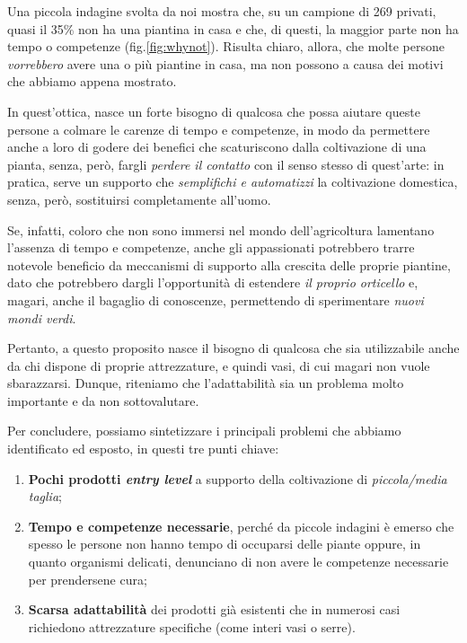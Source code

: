 Una piccola indagine svolta da noi mostra che, su un campione di 269 privati, quasi il 35\% non ha una piantina in casa e che, di questi, la maggior parte non ha tempo o competenze (fig.\ref{fig:whynot}).
Risulta chiaro, allora, che molte persone \textit{vorrebbero} avere una o più piantine in casa, ma non possono a causa dei motivi che abbiamo appena mostrato.

In quest'ottica, nasce un forte bisogno di qualcosa che possa aiutare queste persone a colmare le carenze di tempo e competenze, in modo da permettere anche a loro di godere dei benefici che scaturiscono dalla coltivazione di una pianta, senza, però, fargli \textit{perdere il contatto} con il senso stesso di quest'arte: in pratica, serve un supporto che \textit{semplifichi e automatizzi} la coltivazione domestica, senza, però, sostituirsi completamente all'uomo.

Se, infatti, coloro che non sono immersi nel mondo dell'agricoltura lamentano l'assenza di tempo e competenze, anche gli appassionati potrebbero trarre notevole beneficio da meccanismi di supporto alla crescita delle proprie piantine, dato che potrebbero dargli l'opportunità di estendere \textit{il proprio orticello} e, magari, anche il bagaglio di conoscenze, permettendo di sperimentare \textit{nuovi mondi verdi}.

Pertanto, a questo proposito nasce il bisogno di qualcosa che sia utilizzabile anche da chi dispone di proprie attrezzature, e quindi vasi, di cui magari non vuole sbarazzarsi.
Dunque, riteniamo che l'adattabilità sia un problema molto importante e da non sottovalutare.

Per concludere, possiamo sintetizzare i principali problemi che abbiamo identificato ed esposto, in questi tre punti chiave:
\begin{enumerate}
	\item \textbf{Pochi prodotti \textit{entry level}} a supporto della coltivazione di \textit{piccola/media taglia};
	
	\item \textbf{Tempo e competenze necessarie}, perché da piccole indagini è emerso che spesso le persone non hanno tempo di occuparsi delle piante oppure, in quanto organismi delicati, denunciano di non avere le competenze necessarie per prendersene cura;
	
	\item \textbf{Scarsa adattabilità} dei prodotti già esistenti che in numerosi casi richiedono attrezzature specifiche (come interi vasi o serre).
\end{enumerate}
